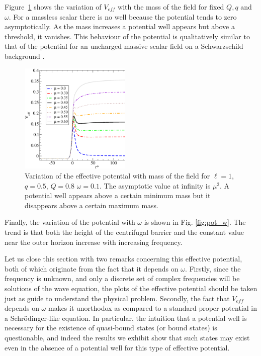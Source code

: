 \documentclass[aps, prd, twocolumn, amsmath, floats,floatfix, superscriptaddress,
nofootinbib, showpacs]{revtex4-1}
\begin{document}


Figure~\ref{fig:pot_mass} shows the variation of $V_{eff}$ with the mass of the field for
fixed $Q,q$ and $\omega$. 
For a massless scalar there is no well because the potential tends to zero
asymptotically. As the mass increases a potential well appears but above a
threshold, it vanishes. This behaviour of the potential is qualitatively
similar to that of the potential for an uncharged massive scalar field on a Schwarzschild
background \cite{Burt:2011pv}.

\begin{figure}[!ht]
\includegraphics[width=0.47\textwidth]{ms_Q0.8_q0.5_w0.1.eps}
\caption{Variation of the effective
potential with mass of the field for $\ell=1$, $q=0.5$, $Q=0.8$ $\omega=0.1$.
The asymptotic value at infinity is $\mu^2$. A potential well appears above a certain
minimum mass but it disappears above a certain maximum mass.}
\label{fig:pot_mass}
\end{figure}

Finally, the variation of the potential with $\omega$ is shown in Fig. \ref{fig:pot_w}. 
The trend is that both the height of the centrifugal barrier and the constant value near
the outer horizon increase with increasing frequency.


Let us close this section with two remarks concerning this effective potential, both of 
which originate from the fact that it depends on $\omega$. Firstly, since the frequency is
unknown, and only a discrete set of complex frequencies will be solutions of the wave
equation, the plots of the effective potential  should be taken just as guide to
understand the physical problem. Secondly, the fact that $V_{eff}$ depends on $\omega$
makes it unorthodox as compared to a standard proper potential in a Schr\"odinger-like
equation. In particular, the intuition that a potential well is necessary for the
existence of quasi-bound states (or bound states) is questionable, and indeed the results
we exhibit show that such states may exist even in the absence of a potential well for
this type of effective potential.
\end{document}
